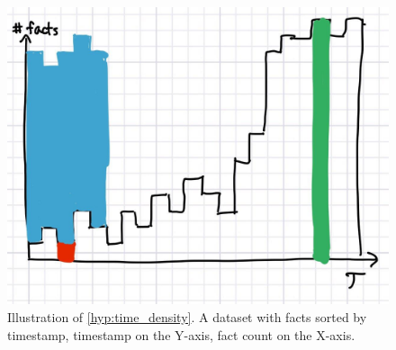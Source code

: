 \begin{figure}[htb]
\centering
\begin{minipage}{0.95\columnwidth}
\centering
\small
\includegraphics[scale=0.18]{content/hypotheses/figures/time_density.jpg}
\caption{Illustration of \autoref{hyp:time_density}. A dataset with facts sorted by timestamp, timestamp on the Y-axis, fact count on the X-axis.
}
\label{fig:time_density}
\end{minipage}
\end{figure}